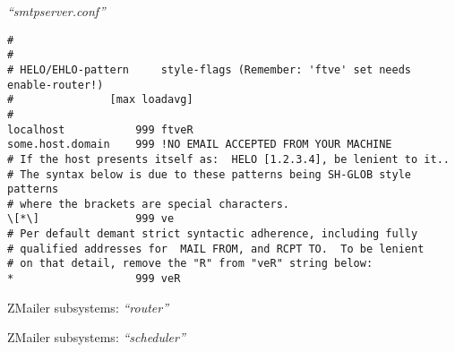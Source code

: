 \documentclass[a4paper,landscape]{slides}
\newcommand{\ZM}{ZMailer}
\begin{document}
\begin{overlay}
\small
\centerline{{\it ``smtpserver.conf''}}
\tiny
\begin{verbatim}
#
#
# HELO/EHLO-pattern     style-flags (Remember: 'ftve' set needs enable-router!)
#               [max loadavg]
#
localhost           999 ftveR
some.host.domain    999 !NO EMAIL ACCEPTED FROM YOUR MACHINE
# If the host presents itself as:  HELO [1.2.3.4], be lenient to it..
# The syntax below is due to these patterns being SH-GLOB style patterns
# where the brackets are special characters.
\[*\]               999 ve
# Per default demant strict syntactic adherence, including fully
# qualified addresses for  MAIL FROM, and RCPT TO.  To be lenient
# on that detail, remove the "R" from "veR" string below:
*                   999 veR

\end{verbatim}

\end{overlay}



\begin{slide}

\centerline{\large \ZM{} subsystems: {\it ``router''}}

\vfill

\end{slide}



\begin{slide}

\centerline{\large \ZM{} subsystems: {\it ``scheduler''}}

\vfill

\end{slide}

\end{document}

